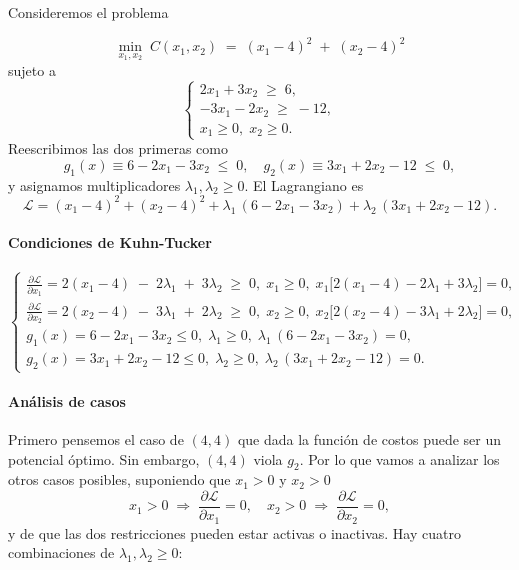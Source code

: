 \documentclass{article}
\begin{document}
Consideremos el problema

\[
\min_{x_1,x_2}\;C(x_1,x_2) \;=\;(x_1-4)^2\;+\;(x_2-4)^2
\]
sujeto a
\[
\begin{cases}
2x_1 + 3x_2 \;\ge\;6,\\
-3x_1 - 2x_2\;\ge\;-12,\\
x_1\ge0,\;x_2\ge0.
\end{cases}
\]
Reescribimos las dos primeras como
\[
g_1(x)\equiv 6 - 2x_1 - 3x_2 \;\le\;0,
\quad
g_2(x)\equiv 3x_1 + 2x_2 - 12\;\le\;0,
\]
y asignamos multiplicadores \(\lambda_1,\lambda_2\ge0\). El Lagrangiano es
\[
\mathcal L
= (x_1-4)^2 + (x_2-4)^2
+ \lambda_1\,(6 - 2x_1 - 3x_2)
+ \lambda_2\,(3x_1 +2x_2 - 12).
\]

\paragraph{Condiciones de Kuhn-Tucker}

\[
\begin{cases}
\displaystyle
\frac{\partial\mathcal L}{\partial x_1}
=2(x_1-4)\;-\;2\lambda_1\;+\;3\lambda_2
\;\ge\;0,
\;x_1\ge0,
\;x_1\bigl[2(x_1-4)-2\lambda_1+3\lambda_2\bigr]=0,\\[6pt]
\displaystyle
\frac{\partial\mathcal L}{\partial x_2}
=2(x_2-4)\;-\;3\lambda_1\;+\;2\lambda_2
\;\ge\;0,
\;x_2\ge0,
\;x_2\bigl[2(x_2-4)-3\lambda_1+2\lambda_2\bigr]=0,\\[6pt]
g_1(x)=6-2x_1-3x_2\le0,\;\lambda_1\ge0,\;\lambda_1\,(6-2x_1-3x_2)=0,\\[4pt]
g_2(x)=3x_1+2x_2-12\le0,\;\lambda_2\ge0,\;\lambda_2\,(3x_1+2x_2-12)=0.
\end{cases}
\]
\paragraph{Análisis de casos}  
Primero pensemos el caso de $(4,4)$ que dada la función de costos puede ser un potencial óptimo. Sin embargo, $(4,4)$ viola $g_2$. Por lo que vamos a analizar los otros casos posibles, suponiendo que $x_1>0$ y $x_2>0$
\[
x_1>0\;\Longrightarrow\;\frac{\partial\mathcal L}{\partial x_1}=0,\quad
x_2>0\;\Longrightarrow\;\frac{\partial\mathcal L}{\partial x_2}=0,
\]
y de que las dos restricciones pueden estar activas o inactivas. Hay cuatro combinaciones de \(\lambda_1,\lambda_2\ge0\):
\end{document}
